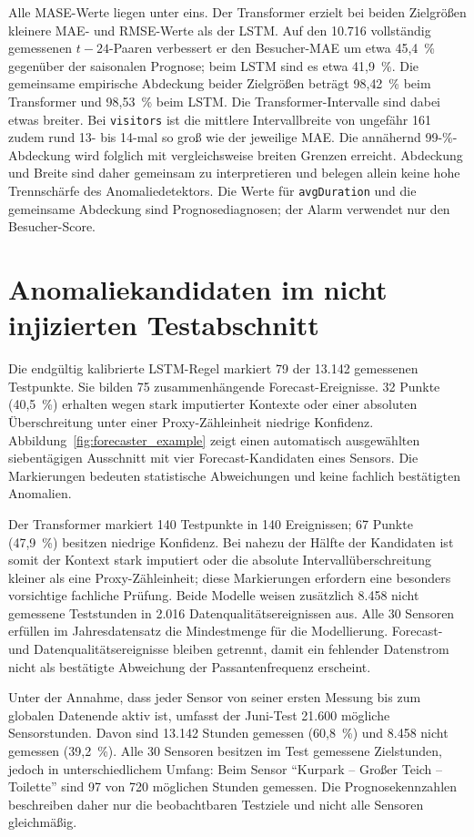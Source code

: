 Alle MASE-Werte liegen unter eins. Der Transformer erzielt bei beiden
Zielgrößen kleinere MAE- und RMSE-Werte als der LSTM. Auf den 10.716
vollständig gemessenen $t-24$-Paaren verbessert er den Besucher-MAE um etwa
45{,}4~\% gegenüber der saisonalen Prognose; beim LSTM sind es etwa
41{,}9~\%. Die gemeinsame empirische Abdeckung beider Zielgrößen beträgt
98{,}42~\% beim Transformer und 98{,}53~\% beim LSTM. Die
Transformer-Intervalle sind dabei etwas breiter. Bei \texttt{visitors} ist
die mittlere Intervallbreite von ungefähr 161 zudem rund 13- bis 14-mal so
groß wie der jeweilige MAE. Die annähernd 99-\%-Abdeckung wird folglich mit
vergleichsweise breiten Grenzen erreicht. Abdeckung und Breite sind daher
gemeinsam zu interpretieren und belegen allein keine hohe
Trennschärfe des Anomaliedetektors. Die Werte für \texttt{avgDuration} und die
gemeinsame Abdeckung sind Prognosediagnosen; der Alarm verwendet nur den
Besucher-Score.

\section{Anomaliekandidaten im nicht injizierten Testabschnitt}

Die endgültig kalibrierte LSTM-Regel markiert 79 der 13.142 gemessenen
Testpunkte. Sie
bilden 75 zusammenhängende Forecast-Ereignisse. 32 Punkte (40{,}5~\%) erhalten wegen
stark imputierter Kontexte oder einer absoluten Überschreitung unter einer
Proxy-Zähleinheit niedrige Konfidenz. Abbildung~\ref{fig:forecaster_example} zeigt einen
automatisch ausgewählten siebentägigen Ausschnitt mit vier
Forecast-Kandidaten eines Sensors.
Die Markierungen bedeuten statistische Abweichungen und keine fachlich
bestätigten Anomalien.

Der Transformer markiert 140 Testpunkte in 140 Ereignissen; 67 Punkte
(47{,}9~\%) besitzen niedrige Konfidenz. Bei nahezu der Hälfte der Kandidaten
ist somit der Kontext stark imputiert oder die absolute Intervallüberschreitung
kleiner als eine Proxy-Zähleinheit; diese Markierungen erfordern eine besonders
vorsichtige fachliche Prüfung. Beide Modelle weisen zusätzlich 8.458 nicht gemessene
Teststunden in 2.016 Datenqualitätsereignissen aus. Alle 30 Sensoren erfüllen
im Jahresdatensatz die Mindestmenge für die Modellierung. Forecast- und
Datenqualitätsereignisse bleiben getrennt, damit ein fehlender Datenstrom
nicht als bestätigte Abweichung der Passantenfrequenz erscheint.

Unter der Annahme, dass jeder Sensor von seiner ersten Messung bis zum globalen
Datenende aktiv ist, umfasst der Juni-Test 21.600 mögliche Sensorstunden. Davon
sind 13.142 Stunden gemessen (60{,}8~\%) und 8.458 nicht gemessen
(39{,}2~\%). Alle 30 Sensoren besitzen im Test gemessene Zielstunden, jedoch in
unterschiedlichem Umfang: Beim Sensor \enquote{Kurpark -- Großer Teich --
Toilette} sind 97 von 720 möglichen Stunden gemessen. Die
Prognosekennzahlen beschreiben daher nur die beobachtbaren Testziele und nicht
alle Sensoren gleichmäßig.

